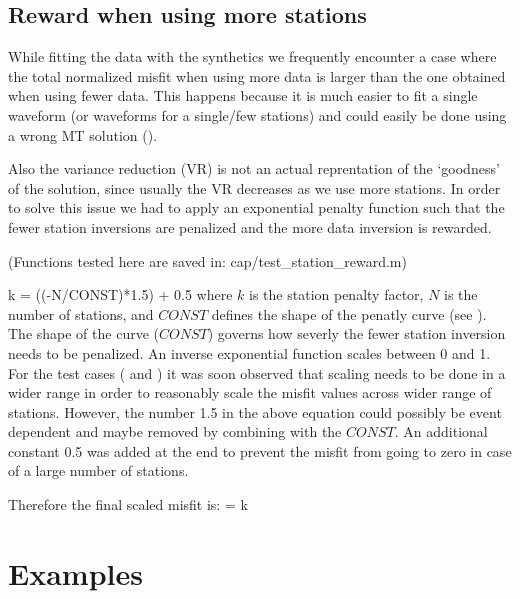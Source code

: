 \documentclass[11pt,titlepage,fleqn]{article}
\begin{document}
\subsection{Reward when using more stations}
While fitting the data with the synthetics we frequently encounter a case where the total normalized misfit when using more data is larger than the one obtained when using fewer data. This happens because it is much easier to fit a single waveform (or waveforms for a single/few stations) and could easily be done using a wrong MT solution (). 

Also the variance reduction (VR) is not an actual reprentation of the `goodness' of the solution, since usually the VR decreases as we use more stations. In order to solve this issue we had to apply an exponential penalty function such that the fewer station inversions are penalized and the more data inversion is rewarded. 

(Functions tested here are saved in: cap/test\_station\_reward.m)

\eq
k = (\exp (-N/CONST)*1.5) + 0.5
\en 
where $k$ is the station penalty factor, $N$ is the number of stations, and $CONST$ defines the shape of the penatly curve (see ). The shape of the curve ($CONST$) governs how severly the fewer station inversion needs to be penalized. An inverse exponential function scales between 0 and 1. For the test cases ( and ) it was soon observed that scaling needs to be done in a wider range in order to reasonably scale the misfit values across wider range of stations. However, the number 1.5 in the above equation could possibly be event dependent and maybe removed by combining with the $CONST$. An additional constant 0.5 was added at the end to prevent the misfit from going to zero in case of a large number of stations. 

Therefore the final scaled misfit is:
\eq
\Phi = k \times \Phi
\en



\section{Examples}
\cite{SilwalTape2016,AlvizuriTape2016,Silwal2015catalog_SAK,Silwal2015catalog_MFFZ,Alvizuri2015catalog,Alvizuri2017catalog,Alvizuri2018}
\end{document}
